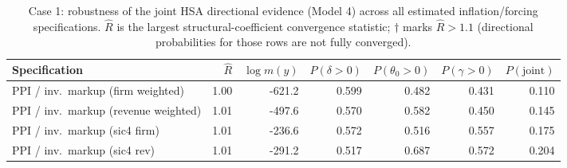 \begin{table}[H]\centering\small
\caption{Case 1: robustness of the joint HSA directional evidence (Model 4) across all estimated inflation/forcing specifications. $\hat R$ is the largest structural-coefficient convergence statistic; $\dagger$ marks $\hat R>1.1$ (directional probabilities for those rows are not fully converged).}
\label{tab:case1_robust}
\footnotesize\setlength{\tabcolsep}{4.5pt}
\begin{tabular}{@{}lrrrrrr@{}}\toprule
Specification & $\hat R$ & $\log m(y)$ & $P(\delta{>}0)$ & $P(\theta_0{>}0)$ & $P(\gamma{>}0)$ & $P(\text{joint})$ \\\midrule
PPI / inv.\ markup (firm weighted) & 1.00 & -621.2 & 0.599 & 0.482 & 0.431 & 0.110 \\
PPI / inv.\ markup (revenue weighted) & 1.01 & -497.6 & 0.570 & 0.582 & 0.450 & 0.145 \\
PPI / inv.\ markup (sic4 firm) & 1.01 & -236.6 & 0.572 & 0.516 & 0.557 & 0.175 \\
PPI / inv.\ markup (sic4 rev) & 1.01 & -291.2 & 0.517 & 0.687 & 0.572 & 0.204 \\
\bottomrule\end{tabular}\end{table}
